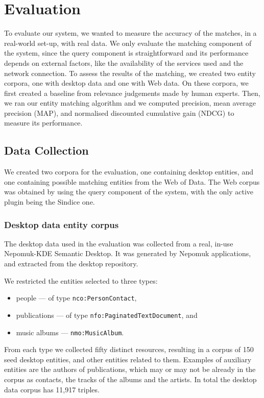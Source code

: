 \section{Evaluation}
\label{sec:sdwodeval}

To evaluate our system, we wanted to measure the accuracy of the matches, in a real-world set-up, with real data. We only evaluate the matching component of the system, since the query component is straightforward and its performance depends on external factors, like the availability of the services used and the network connection.
To assess the results of the matching, we created two entity corpora, one with desktop data and one with Web data. On these corpora, we first created a baseline from relevance judgements made by human experts. Then, we ran our entity matching algorithm and we computed precision, mean average precision (MAP), and normalised discounted cumulative gain (NDCG) to measure its performance. 

\subsection{Data Collection}

We created two corpora for the evaluation, one containing desktop entities, and one containing possible matching entities from the Web of Data. The Web corpus was obtained by using the query component of the system, with the only active plugin being the Sindice one.

\subsubsection{Desktop data entity corpus}

The desktop data used in the evaluation was collected from a real, in-use Nepomuk-KDE Semantic Desktop. It was generated by Nepomuk applications, and extracted from the desktop repository.

We restricted the entities selected to three types: 
\begin{itemize}
 \item people --- of type \verb|nco:PersonContact|, 
 \item publications --- of type \verb|nfo:PaginatedTextDocument|, and 
 \item music albums --- \verb|nmo:MusicAlbum|.
\end{itemize} 
From each type we collected fifty distinct resources, resulting in a corpus of 150 seed desktop entities, and other entities related to them. Examples of auxiliary entities are the authors of publications, which may or may not be already in the corpus as contacts, the tracks of the albums and the artists. In total the desktop data corpus has 11,917 triples.


